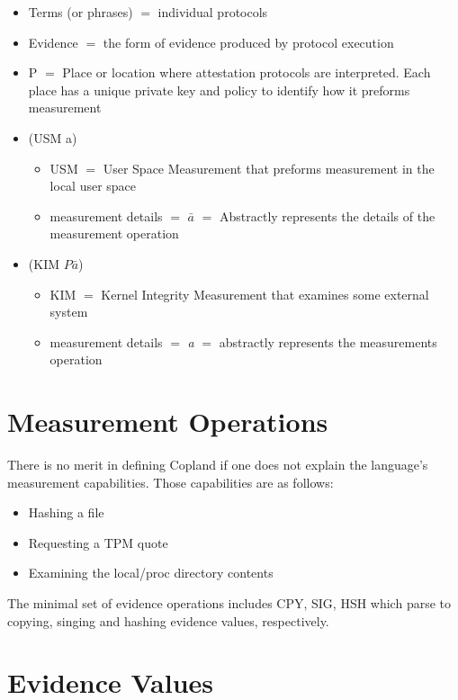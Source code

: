 \documentclass[10pt]{report}
\newcommand{\squash}{\itemsep=0pt\parskip=0pt}
\begin{document}
\begin{itemize}
\squash
\item Terms (or phrases) $=$ individual protocols 
\item Evidence $=$ the form of evidence produced by protocol 
      execution
\item P $=$ Place or location where attestation protocols 
	are interpreted. Each place has a unique private key
	and policy to identify how it preforms measurement
\item (USM  a)
    \squash
	\begin{itemize}
	\item USM $=$ User Space Measurement that preforms 
	measurement in the local user space
	\item measurement details $=$ $\mathit{\bar{a}}$ $=$ Abstractly represents 
	the details of the measurement operation
	\end{itemize}
\item (KIM $\mathit{P \bar{a}}$)
	\squash
	\begin{itemize}
	\item KIM $=$ Kernel Integrity Measurement that 
	examines some external system
	\item measurement details $=$ \textit{a} $=$ abstractly represents 
	the measurements operation
	\end{itemize}
\end{itemize}

\section{Measurement Operations}

There is no merit in defining Copland if one does not 
explain the language's measurement capabilities. 
Those capabilities are as follows:

\begin{itemize}
\squash
\item Hashing a file
\item Requesting a TPM quote
\item Examining the local/proc directory contents
\end{itemize} 

The minimal set of evidence operations includes 
CPY, SIG, HSH which parse to copying, singing 
and hashing evidence values, respectively. 

\section{Evidence Values}
\end{document}
